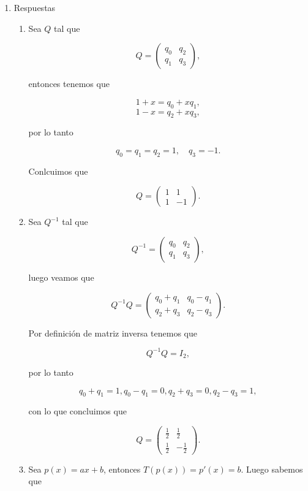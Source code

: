 \documentclass[letterpaper]{article}
\theoremstyle{definition}
\theoremstyle{lemathm}
\theoremstyle{lemademthm}
\begin{document}
\begin{enumerate}
		\item Respuestas
		
		\begin{enumerate}

			\item Sea $Q$ tal que
			
			\[Q = \begin{pmatrix}
				q_0 & q_2\\
				q_1 & q_3
			\end{pmatrix},\]
		
			entonces tenemos que
		
			\[1 + x = q_0 + xq_1,\]
			\[1 - x = q_2 + xq_3,\]
		
			por lo tanto
		
			\[q_0 = q_1 = q_2 = 1, \quad q_3 = -1.\]
		
			Conlcuimos que
		
			\[Q = \begin{pmatrix}
				1 & 1\\
				1 & -1
			\end{pmatrix}.\]
		
			\item Sea $Q^{-1}$ tal que
			
			\[Q^{-1} = \begin{pmatrix}
				q_0 & q_2\\
				q_1 & q_3
			\end{pmatrix},\]
		
			luego veamos que
		
			\[Q^{-1}Q = \begin{pmatrix}
				q_0+q_1 & q_0-q_1\\
				q_2+q_3 & q_2-q_3
			\end{pmatrix}.\]
		
			Por definición de matriz inversa tenemos que
			
			\[Q^{-1}Q = I_2,\]
		
			por lo tanto
		
			\[q_0+q_1 = 1, q_0-q_1 = 0, q_2+q_3 = 0, q_2-q_3=1,\]
		
			con lo que concluimos que
		
			\[Q = \begin{pmatrix}
				\frac{1}{2} & \frac{1}{2}\\
				\frac{1}{2} & -\frac{1}{2}
			\end{pmatrix}.\]
		
			\item Sea $p(x) = ax + b$, entonces $T(p(x)) = p'(x) = b$. Luego sabemos que
		

\end{enumerate}
\end{enumerate}
\end{document}
